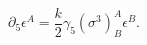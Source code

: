 \begin{equation}
\partial_5\epsilon^A=\frac{k}{2}
\gamma_{5}(\sigma^3)^A_B \epsilon^B.
\end{equation}

